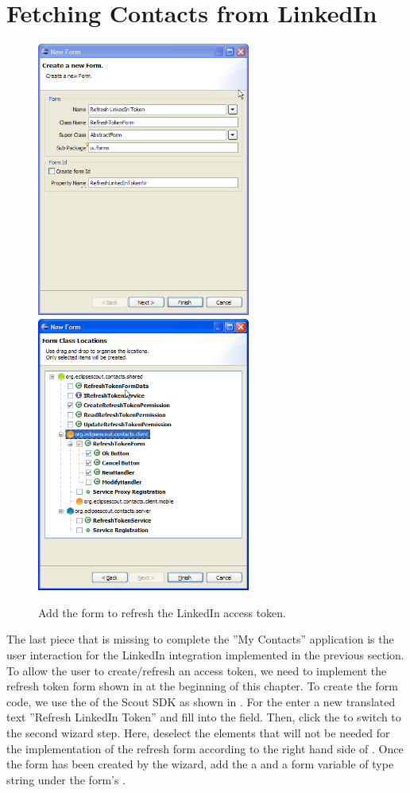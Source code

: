 \documentclass[a4paper,10pt,twoside]{book}
\begin{document}
\section{Fetching Contacts from LinkedIn}

\begin{figure}
\includegraphics[width=7cm]{new_form_token_1.png} \hspace{5mm}
\includegraphics[width=7cm]{new_form_token_2.png}
\caption{Add the form to refresh the LinkedIn access token.}
\end{figure}

The last piece that is missing to complete the ''My Contacts'' application is the user interaction for the LinkedIn integration implemented in the previous section. 
To allow the user to create/refresh an access token, we need to implement the refresh token form shown in  at the beginning of this chapter. 
To create the form code, we use the  of the Scout SDK as shown in . 
For the  enter a new translated text ''Refresh LinkedIn Token'' and fill  into the  field. 
Then, click the  to switch to the second wizard step. 
Here, deselect the elements that will not be needed for the implementation of the refresh form according to the right hand side of . 
Once the form has been created by the wizard, add the a  and a  form variable of type string under the form's . 
\end{document}
